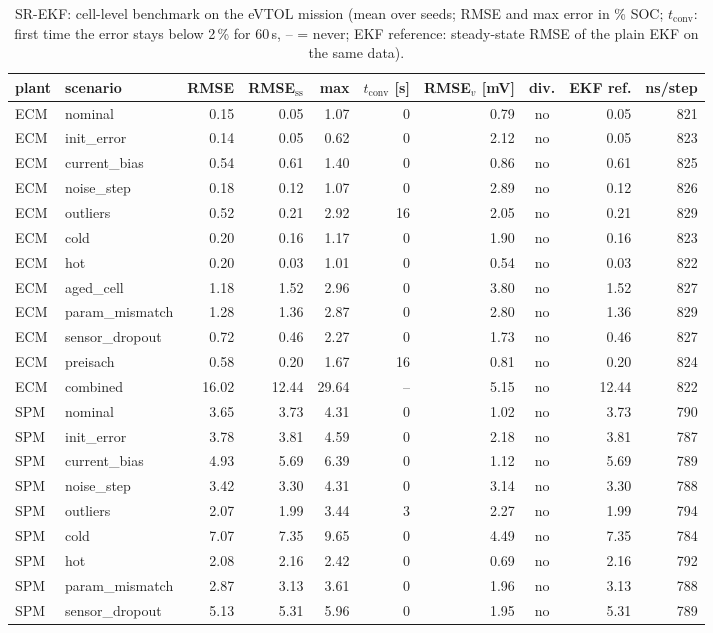\begin{table}[H]\centering\footnotesize\setlength{\tabcolsep}{4pt}
\caption{SR-EKF: cell-level benchmark on the eVTOL mission (mean over seeds; RMSE and max error in \% SOC; $t_\mathrm{conv}$: first time the error stays below 2\,\% for 60\,s, -- = never; EKF reference: steady-state RMSE of the plain EKF on the same data).}\label{tab:cell_SREKF}
\begin{tabular}{llrrrrrcrr}\toprule
plant & scenario & RMSE & RMSE$_\mathrm{ss}$ & max & $t_\mathrm{conv}$ [s] & RMSE$_v$ [mV] & div. & EKF ref. & ns/step \\ \midrule
ECM & nominal & 0.15 & 0.05 & 1.07 & 0 & 0.79 & no & 0.05 & 821 \\
ECM & init\_error & 0.14 & 0.05 & 0.62 & 0 & 2.12 & no & 0.05 & 823 \\
ECM & current\_bias & 0.54 & 0.61 & 1.40 & 0 & 0.86 & no & 0.61 & 825 \\
ECM & noise\_step & 0.18 & 0.12 & 1.07 & 0 & 2.89 & no & 0.12 & 826 \\
ECM & outliers & 0.52 & 0.21 & 2.92 & 16 & 2.05 & no & 0.21 & 829 \\
ECM & cold & 0.20 & 0.16 & 1.17 & 0 & 1.90 & no & 0.16 & 823 \\
ECM & hot & 0.20 & 0.03 & 1.01 & 0 & 0.54 & no & 0.03 & 822 \\
ECM & aged\_cell & 1.18 & 1.52 & 2.96 & 0 & 3.80 & no & 1.52 & 827 \\
ECM & param\_mismatch & 1.28 & 1.36 & 2.87 & 0 & 2.80 & no & 1.36 & 829 \\
ECM & sensor\_dropout & 0.72 & 0.46 & 2.27 & 0 & 1.73 & no & 0.46 & 827 \\
ECM & preisach & 0.58 & 0.20 & 1.67 & 16 & 0.81 & no & 0.20 & 824 \\
ECM & combined & 16.02 & 12.44 & 29.64 & -- & 5.15 & no & 12.44 & 822 \\
\midrule
SPM & nominal & 3.65 & 3.73 & 4.31 & 0 & 1.02 & no & 3.73 & 790 \\
SPM & init\_error & 3.78 & 3.81 & 4.59 & 0 & 2.18 & no & 3.81 & 787 \\
SPM & current\_bias & 4.93 & 5.69 & 6.39 & 0 & 1.12 & no & 5.69 & 789 \\
SPM & noise\_step & 3.42 & 3.30 & 4.31 & 0 & 3.14 & no & 3.30 & 788 \\
SPM & outliers & 2.07 & 1.99 & 3.44 & 3 & 2.27 & no & 1.99 & 794 \\
SPM & cold & 7.07 & 7.35 & 9.65 & 0 & 4.49 & no & 7.35 & 784 \\
SPM & hot & 2.08 & 2.16 & 2.42 & 0 & 0.69 & no & 2.16 & 792 \\
SPM & param\_mismatch & 2.87 & 3.13 & 3.61 & 0 & 1.96 & no & 3.13 & 788 \\
SPM & sensor\_dropout & 5.13 & 5.31 & 5.96 & 0 & 1.95 & no & 5.31 & 789 \\
\bottomrule\end{tabular}\end{table}

